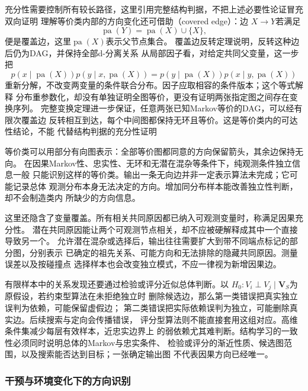 充分性需要控制所有较长路径，这里引用完整结构判据，不把上述必要性论证冒充
双向证明
理解等价类内部的方向变化还可借助（covered edge）：边
\(X\to Y\)若满足
\[
  \operatorname{pa}(Y)=\operatorname{pa}(X)\cup\{X\},
\]
便是覆盖边，这里\(\operatorname{pa}(X)\)表示父节点集合。
覆盖边反转定理说明，反转这种边后仍为DAG，并保持全部d-分离关系
从局部因子看，对给定共同父变量，这一步把
\[
  p(x\mid\operatorname{pa}(X))
  p(y\mid x,\operatorname{pa}(X))
  =
  p(y\mid\operatorname{pa}(X))
  p(x\mid y,\operatorname{pa}(X))
\]
重新分解，不改变两变量的条件联合分布。因子应取相容的条件版本；这个等式解释
分布重参数化，却没有单独证明全图等价，更没有证明两张指定图之间存在变换序列。
完整变换定理进一步保证，任意两张已知Markov等价的DAG，可以经有限次覆盖边
反转相互到达，每个中间图都保持无环且等价。这是等价类内的可达性结论，不能
代替结构判据的充分性证明

等价类可以用部分有向图表示：全部等价图都同意的方向保留箭头，其余边保持无向。
在因果Markov性、忠实性、无环和无潜在混杂等条件下，纯观测条件独立信息一般
只能识别这样的等价类。输出一条无向边并非一定表示算法未完成；它可能记录总体
观测分布本身无法决定的方向。增加同分布样本能改善独立性判断，却不会制造类内
所缺少的方向信息。

这里还隐含了变量覆盖。所有相关共同原因都已纳入可观测变量时，称满足因果充分性。
潜在共同原因能让两个可观测节点相关，却不应被硬解释成其中一个直接导致另一个。
允许潜在混杂或选择后，输出往往需要扩大到带不同端点标记的部分图，分别表示
已确定的祖先关系、可能方向和无法排除的隐藏共同原因。测量误差以及按碰撞点
选择样本也会改变独立模式，不应一律视为新增因果边。

有限样本中的关系发现还要通过检验或评分近似总体判断。以
\(H_0:V_i\perp V_j\mid\bm V_S\)为原假设，若约束型算法在未拒绝独立时
删除候选边，那么第一类错误把真实独立误判为依赖，可能保留虚假边；
第二类错误把实际依赖误判为独立，可能删除真实边。后续搜索与定向会传播错误，
评分型算法则不能直接套用这组对应。高维条件集减少每层有效样本，近忠实边界上
的弱依赖尤其难判断。结构学习的一致性必须同时说明总体的Markov与忠实条件、
检验或评分的渐近性质、候选图范围，以及搜索能否达到目标；一张确定输出图
不代表因果方向已经唯一。

\subsubsection{干预与环境变化下的方向识别}
\label{sec:causal-interventional-structure}

